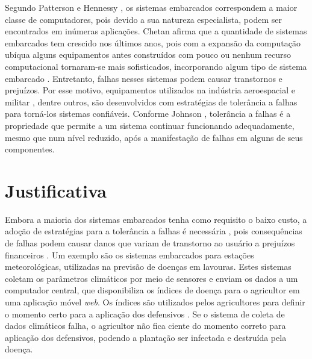 Segundo Patterson e Hennessy \cite{Patterson:2007}, os sistemas embarcados correspondem a maior classe de computadores, pois devido a sua natureza especialista, podem ser encontrados em inúmeras aplicações. Chetan \cite{Chetan:2005} afirma que a quantidade de sistemas embarcados tem crescido nos últimos anos, pois com a expansão da computação ubíqua alguns equipamentos antes construídos com pouco ou nenhum recurso computacional tornaram-se mais sofisticados, incorporando algum tipo de sistema embarcado \cite{Kruger:2014}. Entretanto, falhas nesses sistemas podem causar transtornos e prejuízos. Por esse motivo, equipamentos utilizados na indústria aeroespacial e militar \cite{Nelson:1990}, dentre outros, são desenvolvidos com estratégias de tolerância a falhas para torná-los sistemas confiáveis. Conforme Johnson \cite{Johnson:1984}, tolerância a falhas é a propriedade que permite a um sistema continuar funcionando adequadamente, mesmo que num nível reduzido, após a manifestação de falhas em alguns de seus componentes. 


\section{Justificativa}

Embora a maioria dos sistemas embarcados tenha como requisito o baixo custo, a adoção de estratégias para a tolerância a falhas é necessária \cite{Thomas:1996}, pois consequências de falhas podem causar danos que variam de transtorno ao usuário a prejuízos financeiros \cite{Patterson:2007}. Um exemplo são os sistemas embarcados para estações meteorológicas, utilizadas na previsão de doenças em lavouras. Estes sistemas coletam os parâmetros climáticos por meio de sensores e enviam os dados a um computador central, que disponibiliza os índices de doença para o agricultor em uma aplicação móvel \textit{web}. Os índices são utilizados pelos agricultores para definir o momento certo para a aplicação dos defensivos \cite{Reis:2004,Iaione:1999}. Se o sistema de coleta de dados climáticos falha, o agricultor não fica ciente do momento correto para aplicação dos defensivos, podendo a plantação ser infectada e destruída pela doença.

